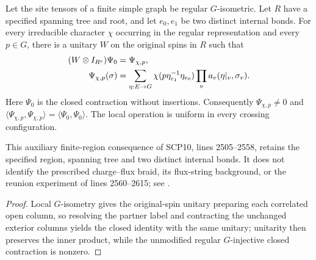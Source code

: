 \begin{lemma}
    \label{thm:peps_closed_charge_pair_preparation}
    \leanok
    Let the site tensors of a finite simple graph be regular $G$-isometric.
    Let $R$ have a specified spanning tree and root, and let $e_0,e_1$ be two
    distinct internal bonds. For every irreducible character $\chi$ occurring in
    the regular representation and every $p\in G$, there is a unitary $W$ on the
    original spins in $R$ such that
    \begin{align}
        (W\otimes I_{R^c})\Psi_0 & =\Psi_{\chi,p},\notag \\
        \Psi_{\chi,p}(\sigma)    & =\sum_{\eta:E\to G}
        \chi(p\eta_{e_1}^{-1}\eta_{e_0})
        \prod_v a_v(\eta|_v,\sigma_v).\notag
    \end{align}
    Here $\Psi_0$ is the closed contraction without insertions.
    Consequently $\Psi_{\chi,p}\ne0$ and
    $\langle\Psi_{\chi,p},\Psi_{\chi,p}\rangle
        =\langle\Psi_0,\Psi_0\rangle$.
    The local operation is uniform in every crossing configuration.

    This auxiliary finite-region consequence of SCP10, lines 2505--2558,
    retains the specified region, spanning tree and two distinct internal bonds.
    It does not identify the prescribed charge--flux braid, its flux-string
    background, or the reunion experiment of lines 2560--2615; see
    \cite{gap:rmp_peps_quantum_double_g_isometry}.
\end{lemma}
\begin{proof}
    \leanok
    Local $G$-isometry gives the original-spin unitary preparing each correlated
    open column, so resolving the partner label and contracting the unchanged
    exterior columns yields the closed identity with the same unitary; unitarity
    then preserves the inner product, while the unmodified regular $G$-injective
    closed contraction is nonzero.
\end{proof}
